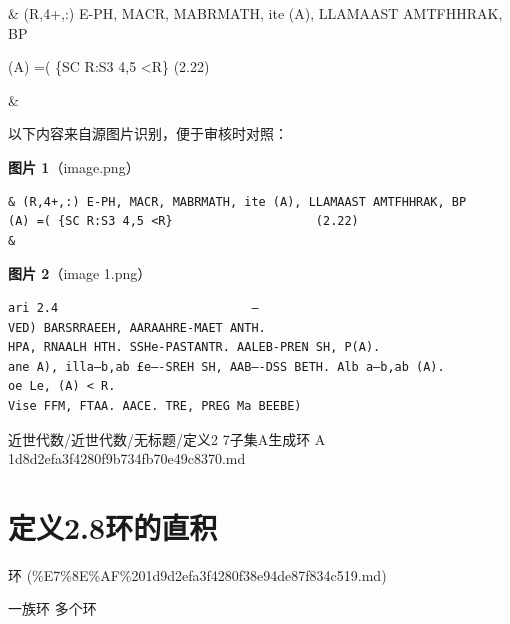 \begin{definition}[定义2.7子集A生成环<A>]

\& (R,4+,:) E-PH, MACR, MABRMATH, ite (A), LLAMAAST AMTFHHRAK, BP

(A) =( \{SC R:S3 4,5 <R\}                    (2.22)

\&

\end{definition}

\begin{note}
以下内容来自源图片识别，便于审核时对照：

\textbf{图片 1}（image.png）
\begin{Verbatim}[fontsize=\small]
& (R,4+,:) E-PH, MACR, MABRMATH, ite (A), LLAMAAST AMTFHHRAK, BP
(A) =( {SC R:S3 4,5 <R}                    (2.22)
&
\end{Verbatim}

\textbf{图片 2}（image 1.png）
\begin{Verbatim}[fontsize=\small]
ari 2.4                           —
VED) BARSRRAEEH, AARAAHRE-MAET ANTH.
HPA, RNAALH HTH. SSHe-PASTANTR. AALEB-PREN SH, P(A).
ane A), illa—b,ab £e—-SREH SH, AAB—-DSS BETH. Alb a—b,ab (A).
oe Le, (A) < R.
Vise FFM, FTAA. AACE. TRE, PREG Ma BEEBE)
\end{Verbatim}

\end{note}

\begin{note}[来源路径]

近世代数/近世代数/无标题/定义2 7子集A生成环 A 1d8d2efa3f4280f9b734fb70e49c8370.md

\end{note}

\section*{定义2.8环的直积}

\begin{note}[来源上级主题]

环 (\%E7\%8E\%AF\%201d9d2efa3f4280f38e94de87f834c519.md)

\end{note}

\begin{definition}[定义2.8环的直积]

一族环 多个环

\end{definition}

